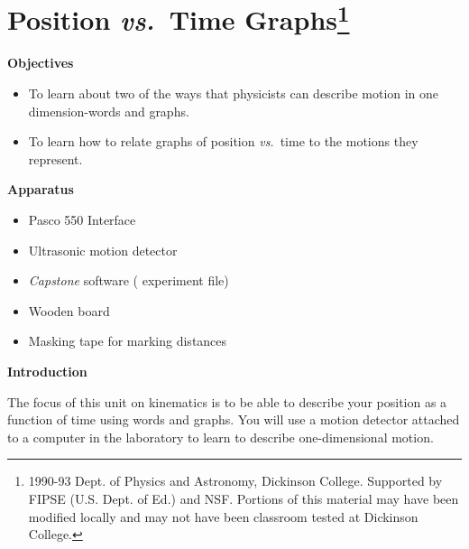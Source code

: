 
\section{Position \textit{vs.}~Time Graphs\footnote{
1990-93 Dept. of Physics and Astronomy, Dickinson College. Supported by FIPSE
(U.S. Dept. of Ed.) and NSF. Portions of this material may have been modified
locally and may not have been classroom tested at Dickinson College.
}}

\makelabheader %

\bigskip

\textbf{Objectives} 

\begin{itemize}[nosep]
\item To learn about two of the ways that physicists can describe motion in one dimension-words
and graphs. 
\item To learn how to relate graphs of position \textit{vs.}~time to the motions they represent.
\end{itemize}

\bigskip

\textbf{Apparatus} 

\begin{itemize}[nosep]
\item Pasco 550 Interface
\item Ultrasonic motion detector 
\item \textit{Capstone} software ( experiment file)
\item Wooden board
\item Masking tape for marking distances
\end{itemize}

\bigskip

\textbf{Introduction} 

The focus of this unit on kinematics is to be able to describe your position
as a function of time using words and graphs. You will use a motion detector
attached to a computer in the laboratory to learn to describe one-dimensional
motion.

